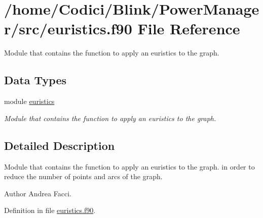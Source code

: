 \hypertarget{euristics_8f90}{\section{/home/\-Codici/\-Blink/\-Power\-Manager/src/euristics.f90 File Reference}
\label{euristics_8f90}
}


Module that contains the function to apply an euristics to the graph.  


\subsection*{Data Types}
\begin{DoxyCompactItemize}
\item 
module \hyperlink{classeuristics}{euristics}
\begin{DoxyCompactList}\small\item\em Module that contains the function to apply an euristics to the graph. \end{DoxyCompactList}\end{DoxyCompactItemize}


\subsection{Detailed Description}
Module that contains the function to apply an euristics to the graph. in order to reduce the number of points and arcs of the graph. \begin{DoxyAuthor}{Author}
Andrea Facci. 
\end{DoxyAuthor}


Definition in file \hyperlink{euristics_8f90_source}{euristics.\-f90}.

